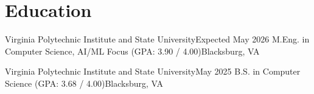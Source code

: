 \section{Education}
\resumeSubHeadingListStart

\resumeSubheading
{Virginia Polytechnic Institute and State University}{Expected May 2026}
{M.Eng. in Computer Science, AI/ML Focus (GPA: 3.90 / 4.00)}{Blacksburg, VA}

\resumeSubheading
{Virginia Polytechnic Institute and State University}{May 2025}
{B.S. in Computer Science (GPA: 3.68 / 4.00)}{Blacksburg, VA}
\resumeItemListStart
\resumeItemListEnd

\resumeSubHeadingListEnd
